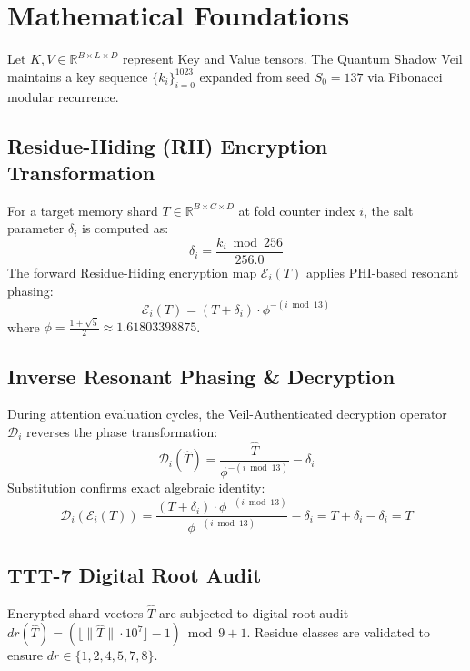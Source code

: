 \section{Mathematical Foundations}
Let $K, V \in \mathbb{R}^{B \times L \times D}$ represent Key and Value tensors. The Quantum Shadow Veil maintains a key sequence $\{k_i\}_{i=0}^{1023}$ expanded from seed $S_0 = 137$ via Fibonacci modular recurrence.

\subsection{Residue-Hiding (RH) Encryption Transformation}
For a target memory shard $T \in \mathbb{R}^{B \times C \times D}$ at fold counter index $i$, the salt parameter $\delta_i$ is computed as:
\begin{equation}
    \delta_i = \frac{k_i \bmod 256}{256.0}
\end{equation}
The forward Residue-Hiding encryption map $\mathcal{E}_i(T)$ applies PHI-based resonant phasing:
\begin{equation}
    \mathcal{E}_i(T) = (T + \delta_i) \cdot \phi^{-(i \bmod 13)}
\end{equation}
where $\phi = \frac{1+\sqrt{5}}{2} \approx 1.61803398875$.

\subsection{Inverse Resonant Phasing & Decryption}
During attention evaluation cycles, the Veil-Authenticated decryption operator $\mathcal{D}_i$ reverses the phase transformation:
\begin{equation}
    \mathcal{D}_i(\hat{T}) = \frac{\hat{T}}{\phi^{-(i \bmod 13)}} - \delta_i
\end{equation}
Substitution confirms exact algebraic identity:
\begin{equation}
    \mathcal{D}_i(\mathcal{E}_i(T)) = \frac{(T + \delta_i) \cdot \phi^{-(i \bmod 13)}}{\phi^{-(i \bmod 13)}} - \delta_i = T + \delta_i - \delta_i = T
\end{equation}

\subsection{TTT-7 Digital Root Audit}
Encrypted shard vectors $\hat{T}$ are subjected to digital root audit $dr(\hat{T}) = (\lfloor \|\hat{T}\| \cdot 10^7 \rfloor - 1) \bmod 9 + 1$. Residue classes are validated to ensure $dr \in \{1, 2, 4, 5, 7, 8\}$.
